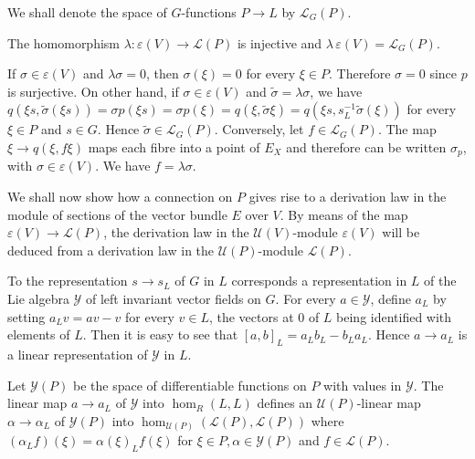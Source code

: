 We shall denote the space of $G$-functions $P \to L$ by $\mathscr{L}_G (P)$.

\begin{proposition}%
  The homomorphism $\lambda : \varepsilon (V) \to \mathscr{L}(P)$ is
  injective and $\lambda \,\varepsilon(V) = \mathscr{L}_G (P)$. 
\end{proposition}

If $\sigma \in \varepsilon(V)$ and $\lambda \sigma = 0$, then $\sigma
(\xi) = 0$ for every $\xi \in P$. Therefore $\sigma = 0$ since $p$ is
surjective. On other hand, if $\sigma \in \varepsilon (V)$ and
$\tilde{\sigma} = \lambda \sigma$, we have $q(\xi s,
\tilde{\sigma}(\xi s)) = \sigma p (\xi s) = \sigma p (\xi) = q(\xi ,
\tilde{\sigma} \xi) = q(\xi s, s^{-1}_L \tilde{\sigma} (\xi))$ for every $\xi
\in P$ and $s \in G$. Hence $\tilde{\sigma} \in \mathscr{L}_G
(P)$. Conversely, let $f \in \mathscr{L}_G (P)$. The map $\xi
\to q(\xi , f \xi)$ maps each fibre into a point of $E_X$ and
therefore can be written $\sigma_p$, with $\sigma \in \varepsilon
(V)$. We have $f = \lambda \sigma$. 

We shall now show how a connection on $P$ gives rise to a derivation
law in the module of sections of the vector bundle $E$ over $V$. By
means of the map $\varepsilon (V) \to \mathscr{L} (P)$, the derivation
law in the $\mathscr{U}(V)$-module $\varepsilon (V)$ will be deduced
from a derivation law in the $\mathscr{U}(P)$-module
$\mathscr{L}(P)$.\pageoriginale 

To the representation $s \to s_L$ of $G$ in $L$ corresponds a
representation in $L$ of the Lie algebra $\mathscr{Y}$ of left
invariant vector fields on $G$. For every $a \in \mathscr{Y}$, define
$a_L$ by setting $a_L v = av-v$ for every $v \in L$, the vectors at
$0$ of $L$ being identified with elements of $L$. Then it is easy to
see that $[a, b]_L = a_L b_L - b_L a_L$. Hence $a \to a_L$ is a linear
representation of $\mathscr{Y}$ in $L$. 

Let $\mathscr{Y}(P)$ be the  space of differentiable functions on $P$
with values in $\mathscr{Y}$. The linear map $a \to a_L$ of
$\mathscr{Y}$ into $\hom_R (L, L)$ defines an $\mathscr{U}(P)$-linear
map $\alpha \to \alpha_L$ of $\mathscr{Y}(P)$ into
$\hom_{\mathscr{U}(P)} (\mathscr{L}(P), \mathscr{L}(P))$ where
$(\alpha_L f) (\xi) = \alpha (\xi)_L f(\xi)$ for $\xi \in P, \alpha
\in \mathscr{Y} (P)$ and $f \in \mathscr{L} (P)$. 

